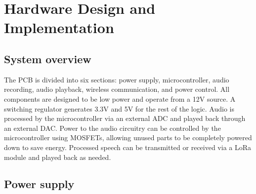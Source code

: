 \section{Hardware Design and Implementation}

\subsection{System overview}

The PCB is divided into six sections: power supply, microcontroller, audio recording, audio playback,
 wireless communication, and power control.
All components are designed to be low power and operate from a 12V source.
A switching regulator generates 3.3V and 5V for the rest of the logic.
Audio is processed by the microcontroller via an external ADC and played back through an external DAC.
Power to the audio circuitry can be controlled by the microcontroller using MOSFETs, allowing unused parts to be completely powered down to save energy.
Processed speech can be transmitted or received via a LoRa module and played back as needed.

\subsection{Power supply}


